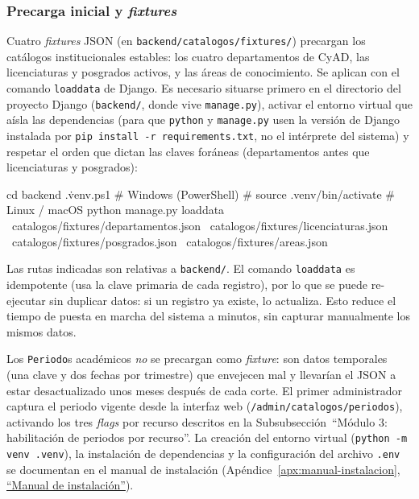 \subsubsection{Precarga inicial y \emph{fixtures}}

Cuatro \emph{fixtures} JSON (en \texttt{backend/catalogos/fixtures/}) precargan los catálogos institucionales estables: los cuatro departamentos de CyAD, las licenciaturas y posgrados activos, y las áreas de conocimiento. Se aplican con el comando \texttt{loaddata} de Django. Es necesario situarse primero en el directorio del proyecto Django (\texttt{backend/}, donde vive \texttt{manage.py}), activar el entorno virtual que aísla las dependencias (para que \texttt{python} y \texttt{manage.py} usen la versión de Django instalada por \texttt{pip install -r requirements.txt}, no el intérprete del sistema) y respetar el orden que dictan las claves foráneas (departamentos antes que licenciaturas y posgrados):

\begin{Comandos}
cd backend
.\.venv\Scripts\Activate.ps1   # Windows (PowerShell)
# source .venv/bin/activate    # Linux / macOS
python manage.py loaddata \
    catalogos/fixtures/departamentos.json \
    catalogos/fixtures/licenciaturas.json \
    catalogos/fixtures/posgrados.json \
    catalogos/fixtures/areas.json
\end{Comandos}

Las rutas indicadas son relativas a \texttt{backend/}. El comando \texttt{loaddata} es idempotente (usa la clave primaria de cada registro), por lo que se puede re-ejecutar sin duplicar datos: si un registro ya existe, lo actualiza. Esto reduce el tiempo de puesta en marcha del sistema a minutos, sin capturar manualmente los mismos datos.

Los \texttt{Periodo}s académicos \emph{no} se precargan como \emph{fixture}: son datos temporales (una clave y dos fechas por trimestre) que envejecen mal y llevarían el JSON a estar desactualizado unos meses después de cada corte. El primer administrador captura el periodo vigente desde la interfaz web (\texttt{/admin/catalogos/periodos}), activando los tres \emph{flags} por recurso descritos en la Subsubsección~``Módulo 3: habilitación de periodos por recurso''. La creación del entorno virtual (\texttt{python -m venv .venv}), la instalación de dependencias y la configuración del archivo \texttt{.env} se documentan en el manual de instalación (Apéndice~\ref{apx:manual-instalacion}, \hyperref[apx:manual-instalacion]{``Manual de instalación''}).

